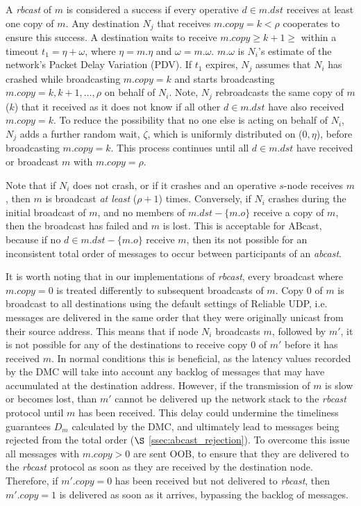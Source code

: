     A \emph{rbcast} of $m$ is considered a success if every operative $d \in m.dst$ receives at least one copy of $m$.  Any destination $N_j$ that receives $m.copy = k < \rho$ cooperates to ensure this success.  A destination waits to receive $m.copy \geq k + 1 \geq$ within a timeout $t_1 = \eta + \omega$, where $\eta= m.\eta$ and $\omega=m.\omega$.  $m.\omega$ is $N_i$'s estimate of the network's Packet Delay Variation (PDV).  If $t_1$ expires, $N_j$ assumes that $N_i$ has crashed while broadcasting $m.copy = k$ and starts broadcasting $m.copy = k, k+1,\ldots, \rho$ on behalf of $N_i$. Note, $N_j$ rebroadcasts the same copy of $m$ ($k$) that it received as it does not know if all other $d \in m.dst$ have also received $m.copy = k$.  To reduce the possibility that no one else is acting on behalf of $N_i$, $N_j$ adds a further random wait, $\zeta$, which is uniformly distributed on ($0,\eta$), before broadcasting $m.copy = k$.  This process continues until all $d \in m.dst$ have received or broadcast $m$ with $m.copy = \rho$.  
    
    Note that if $N_i$ does not crash, or if it crashes and an operative $s$-node receives $m$, then $m$ is broadcast \emph{at least} ($\rho + 1$) times.  Conversely, if $N_i$ crashes during the initial broadcast of $m$, and no members of $m.dst - \{m.o\}$ receive a copy of $m$, then the broadcast has failed and $m$ is lost.  This is acceptable for \textsf{ABcast}, because if no $d \in m.dst - \{m.o\}$ receive $m$, then its not possible for an inconsistent total order of messages to occur between participants of an \emph{abcast}.  
    
    It is worth noting that in our implementations of \emph{rbcast}, every broadcast where $m.copy = 0$ is treated differently to subsequent broadcasts of $m$.  Copy 0 of $m$ is broadcast to all destinations using the default settings of Reliable UDP, i.e. messages are delivered in the same order that they were originally unicast from their source address.  This means that if node $N_i$ broadcasts $m$, followed by $m'$, it is not possible for any of the destinations to receive copy 0 of $m'$ before it has received $m$.  In normal conditions this is beneficial, as the latency values recorded by the DMC will take into account any backlog of messages that may have accumulated at the destination address.  However, if the transmission of $m$ is slow or becomes lost, than $m'$ cannot be delivered up the network stack to the \emph{rbcast} protocol until $m$ has been received.  This delay could undermine the timeliness guarantees $D_m$ calculated by the DMC, and ultimately lead to messages being rejected from the total order ($\S$ \ref{ssec:abcast_rejection}).  To overcome this issue all messages with $m.copy > 0$ are sent OOB, to ensure that they are delivered to the \emph{rbcast} protocol as soon as they are received by the destination node.  Therefore, if $m'.copy = 0$ has been received but not delivered to \emph{rbcast}, then $m'.copy = 1$ is delivered as soon as it arrives, bypassing the backlog of messages.  
    
